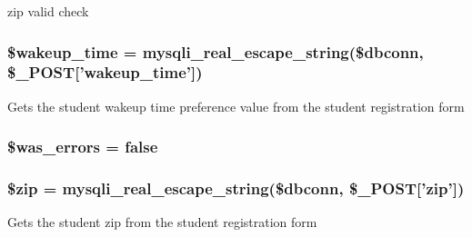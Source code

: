 zip valid check \hypertarget{user__view_2validate_2studentVal_8php_ade31df5f8971826d6902226d01975007}{
\subsubsection[{\$wakeup\-\_\-time}]{\setlength{\rightskip}{0pt plus 5cm}\$wakeup\-\_\-time = mysqli\-\_\-real\-\_\-escape\-\_\-string(\$dbconn, \$\-\_\-\-P\-O\-S\-T\mbox{[}'wakeup\-\_\-time'\mbox{]})}}\label{user__view_2validate_2studentVal_8php_ade31df5f8971826d6902226d01975007}
\-Gets the student wakeup time preference value from the student registration form \hypertarget{user__view_2validate_2studentVal_8php_ae8f928f475945454d3cfd1d4214c09f2}{
\subsubsection[{\$was\-\_\-errors}]{\setlength{\rightskip}{0pt plus 5cm}\$was\-\_\-errors = false}}\label{user__view_2validate_2studentVal_8php_ae8f928f475945454d3cfd1d4214c09f2}
\hypertarget{user__view_2validate_2studentVal_8php_aa91be3142812d8cd4221c6f54555079b}{
\subsubsection[{\$zip}]{\setlength{\rightskip}{0pt plus 5cm}\$zip = mysqli\-\_\-real\-\_\-escape\-\_\-string(\$dbconn, \$\-\_\-\-P\-O\-S\-T\mbox{[}'zip'\mbox{]})}}\label{user__view_2validate_2studentVal_8php_aa91be3142812d8cd4221c6f54555079b}
\-Gets the student zip from the student registration form 